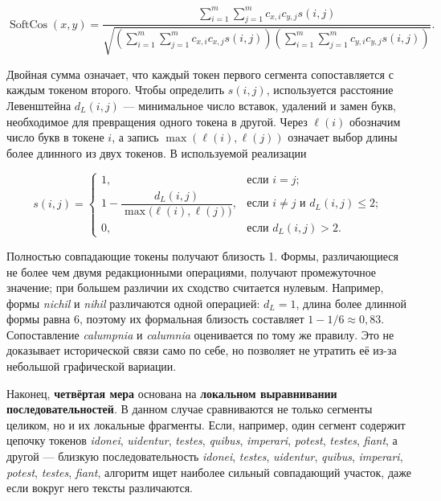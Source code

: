 \begin{equation}
\operatorname{SoftCos}(x,y)=
\frac{
\displaystyle\sum_{i=1}^{m}\sum_{j=1}^{m}c_{x,i}c_{y,j}s(i,j)}
{\sqrt{
\left(\displaystyle\sum_{i=1}^{m}\sum_{j=1}^{m}c_{x,i}c_{x,j}s(i,j)\right)
\left(\displaystyle\sum_{i=1}^{m}\sum_{j=1}^{m}c_{y,i}c_{y,j}s(i,j)\right)}}.
\end{equation}

Двойная сумма означает, что каждый токен первого сегмента сопоставляется с каждым токеном второго. Чтобы определить $s(i,j)$, используется расстояние Левенштейна $d_L(i,j)$ --- минимальное число вставок, удалений и замен букв, необходимое для превращения одного токена в другой. Через $\ell(i)$ обозначим число букв в токене $i$, а запись $\max(\ell(i),\ell(j))$ означает выбор длины более длинного из двух токенов. В используемой реализации

\begin{equation}
s(i,j)=
\begin{cases}
1, & \text{если }i=j;\\[3pt]
1-\dfrac{d_L(i,j)}{\max\bigl(\ell(i),\ell(j)\bigr)},
& \text{если }i\neq j\text{ и }d_L(i,j)\leq2;\\[8pt]
0, & \text{если }d_L(i,j)>2.
\end{cases}
\end{equation}

Полностью совпадающие токены получают близость 1. Формы, различающиеся не более чем двумя редакционными операциями, получают промежуточное значение; при большем различии их сходство считается нулевым. Например, формы \emph{nichil} и \emph{nihil} различаются одной операцией: $d_L=1$, длина более длинной формы равна 6, поэтому их формальная близость составляет $1-1/6\approx0{,}83$. Сопоставление \emph{calumpnia} и \emph{calumnia} оценивается по тому же правилу. Это не доказывает исторической связи само по себе, но позволяет не утратить её из-за небольшой графической вариации.

Наконец, \textbf{четвёртая мера} основана на \textbf{локальном выравнивании последовательностей}. В данном случае сравниваются не только сегменты целиком, но и их локальные фрагменты. Если, например, один сегмент содержит цепочку токенов \emph{idonei}, \emph{uidentur}, \emph{testes}, \emph{quibus}, \emph{imperari}, \emph{potest}, \emph{testes}, \emph{fiant}, а другой --- близкую последовательность \emph{idonei}, \emph{testes}, \emph{uidentur}, \emph{quibus}, \emph{imperari}, \emph{potest}, \emph{testes}, \emph{fiant}, алгоритм ищет наиболее сильный совпадающий участок, даже если вокруг него тексты различаются.

